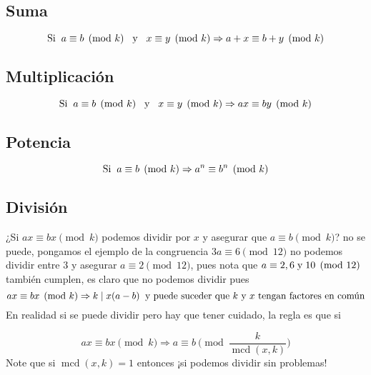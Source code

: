 \documentclass[11pt]{scrartcl}
\begin{document}
\subsection*{Suma}
\[\text{Si}\hspace{0.2cm}a\equiv b\pmod k\hspace{0.3cm}\text{y}\hspace{0.3cm} x\equiv y\pmod k\Rightarrow a+x\equiv b+y\pmod k\]

\subsection*{Multiplicación}
\[\text{Si}\hspace{0.2cm}a\equiv b\pmod k\hspace{0.3cm}\text{y}\hspace{0.3cm} x\equiv y\pmod k\Rightarrow ax\equiv by\pmod k\]

\subsection*{Potencia}
\[\text{Si}\hspace{0.2cm}a\equiv b\pmod k\Rightarrow a^n\equiv b^n\pmod k\]
\vspace{0.1cm}

\subsection*{División}
¿Si $ax\equiv bx\pmod k$ podemos dividir por $x$ y asegurar que $a\equiv b\pmod k$? no se puede, pongamos el ejemplo de la congruencia $3a\equiv 6\pmod {12}$ no podemos dividir entre $3$ y asegurar $a\equiv 2\pmod {12}$, pues nota que $a\equiv 2,6\hspace{0.1cm}\text{y}\hspace{0.1cm} 10\pmod {12}$ también cumplen, es claro que no podemos dividir pues 
\[ax\equiv bx\pmod k \Rightarrow k\mid x(a-b) \hspace{0.2cm} \text{y puede suceder que $k$ y $x$ tengan factores en común}\]
En realidad si se puede dividir pero hay que tener cuidado, la regla es que si

\[ax\equiv bx\pmod k\Rightarrow a\equiv b\pmod{ \frac{k}{\operatorname{mcd}(x,k)}}\]
Note que si $\operatorname{mcd}(x,k)=1$ entonces ¡si podemos dividir sin problemas!
\end{document}
